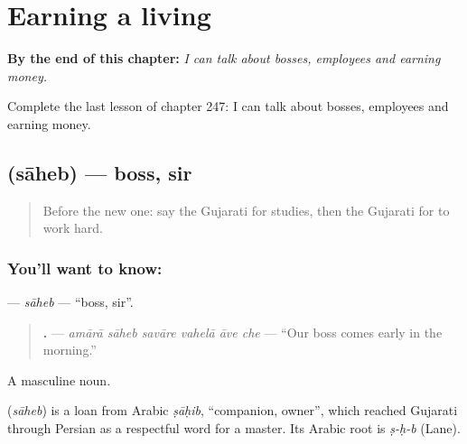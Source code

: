 
\chapter{Earning a living}
\label{ch:gu-earning-a-living}

\begin{chapteropening}
\textbf{By the end of this chapter:} \emph{I can talk about bosses, employees and earning money.}

Complete the last lesson of chapter 247: I can talk about bosses, employees and earning money.
\end{chapteropening}

\section[\texorpdfstring{\gu{સાહેબ} (sāheb)}{સાહેબ (sāheb)}]{ (sāheb) — boss, sir}

\label{lesson:GU-C247-saheb}



\begin{quote}
Before the new one: say the Gujarati for studies, then the Gujarati for to work hard.
\end{quote}

\subsection*{You'll want to know: }
\textbf{} — \emph{sāheb} — \textquotedblleft{}boss, sir\textquotedblright{}.

\begin{quote}
\textbf{     .} — \emph{amārā sāheb savāre vahelā āve che} — \textquotedblleft{}Our boss comes early in the morning.\textquotedblright{}
\end{quote}

A masculine noun.

\begin{cousinweb}
\textbf{} (\emph{sāheb}) is a loan from Arabic \emph{ṣāḥib}, \textquotedblleft{}companion, owner\textquotedblright{}, which reached Gujarati through Persian as a respectful word for a master. Its Arabic root is \emph{ṣ-ḥ-b} (Lane).
\end{cousinweb}

